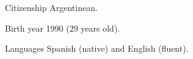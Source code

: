 
\begin{cvskills}

	\cvskill
	{Citizenship}
    {Argentinean.}

	\cvskill
	{Birth year}
    {1990 (29 years old).}

	\cvskill
	{Languages}
    {Spanish (native) and English (fluent).}

\end{cvskills}
